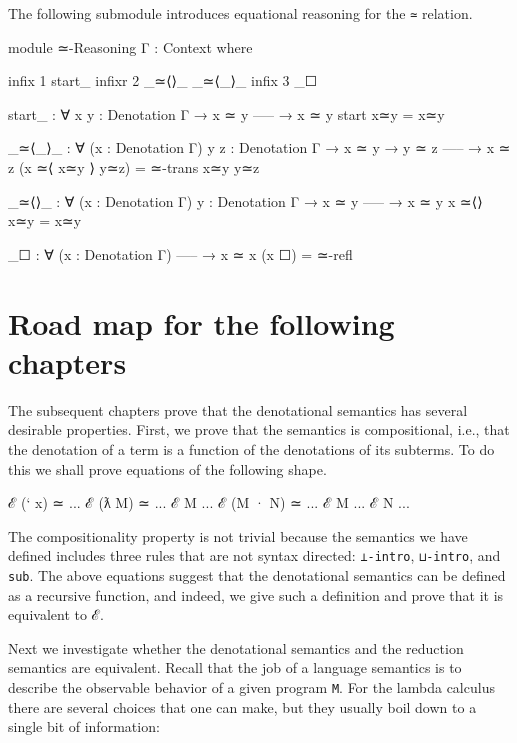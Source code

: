 The following submodule introduces equational reasoning for the
\texttt{≃} relation.

\begin{fence}
\begin{code}

module ≃-Reasoning {Γ : Context} where

  infix  1 start_
  infixr 2 _≃⟨⟩_ _≃⟨_⟩_
  infix  3 _☐

  start_ : ∀ {x y : Denotation Γ}
    → x ≃ y
      -----
    → x ≃ y
  start x≃y  =  x≃y

  _≃⟨_⟩_ : ∀ (x : Denotation Γ) {y z : Denotation Γ}
    → x ≃ y
    → y ≃ z
      -----
    → x ≃ z
  (x ≃⟨ x≃y ⟩ y≃z) =  ≃-trans x≃y y≃z

  _≃⟨⟩_ : ∀ (x : Denotation Γ) {y : Denotation Γ}
    → x ≃ y
      -----
    → x ≃ y
  x ≃⟨⟩ x≃y  =  x≃y

  _☐ : ∀ (x : Denotation Γ)
      -----
    → x ≃ x
  (x ☐)  =  ≃-refl
\end{code}
\end{fence}

\hypertarget{road-map-for-the-following-chapters}{%
\section{Road map for the following
chapters}\label{road-map-for-the-following-chapters}}

The subsequent chapters prove that the denotational semantics has
several desirable properties. First, we prove that the semantics is
compositional, i.e., that the denotation of a term is a function of the
denotations of its subterms. To do this we shall prove equations of the
following shape.

\begin{myDisplay}
ℰ (` x) ≃ ...
ℰ (ƛ M) ≃ ... ℰ M ...
ℰ (M · N) ≃ ... ℰ M ... ℰ N ...
\end{myDisplay}

The compositionality property is not trivial because the semantics we
have defined includes three rules that are not syntax directed:
\texttt{⊥-intro}, \texttt{⊔-intro}, and \texttt{sub}. The above
equations suggest that the denotational semantics can be defined as a
recursive function, and indeed, we give such a definition and prove that
it is equivalent to ℰ.

Next we investigate whether the denotational semantics and the reduction
semantics are equivalent. Recall that the job of a language semantics is
to describe the observable behavior of a given program \texttt{M}. For
the lambda calculus there are several choices that one can make, but
they usually boil down to a single bit of information:

